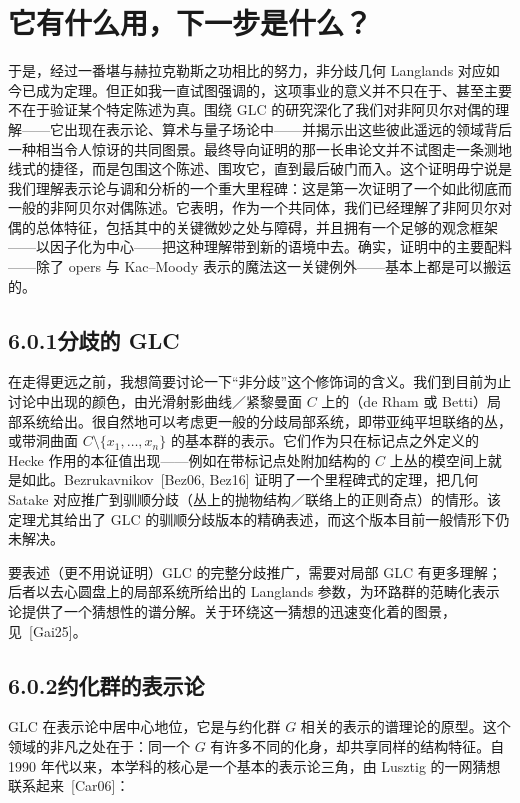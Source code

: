 \section{它有什么用，下一步是什么？}\label{sec:6}

于是，经过一番堪与赫拉克勒斯之功相比的努力，非分歧几何 Langlands 对应如今已成为定理。但正如我一直试图强调的，这项事业的意义并不只在于、甚至主要不在于验证某个特定陈述为真。围绕 GLC 的研究深化了我们对非阿贝尔对偶的理解——它出现在表示论、算术与量子场论中——并揭示出这些彼此遥远的领域背后一种相当令人惊讶的共同图景。最终导向证明的那一长串论文并不试图走一条测地线式的捷径，而是包围这个陈述、围攻它，直到最后破门而入。这个证明毋宁说是我们理解表示论与调和分析的一个重大里程碑：这是第一次证明了一个如此彻底而一般的非阿贝尔对偶陈述。它表明，作为一个共同体，我们已经理解了非阿贝尔对偶的总体特征，包括其中的关键微妙之处与障碍，并且拥有一个足够的观念框架——以因子化为中心——把这种理解带到新的语境中去。确实，证明中的主要配料——除了 opers 与 Kac–Moody 表示的魔法这一关键例外——基本上都是可以搬运的。

\subsection*{6.0.1\quad 分歧的 GLC}

在走得更远之前，我想简要讨论一下“非分歧”这个修饰词的含义。我们到目前为止讨论中出现的颜色，由光滑射影曲线／紧黎曼面 $C$ 上的（de Rham 或 Betti）局部系统给出。很自然地可以考虑更一般的分歧局部系统，即带亚纯平坦联络的丛，或带洞曲面 $C\setminus\{x_{1},\dots,x_{n}\}$ 的基本群的表示。它们作为只在标记点之外定义的 Hecke 作用的本征值出现——例如在带标记点处附加结构的 $C$ 上丛的模空间上就是如此。Bezrukavnikov~[Bez06, Bez16] 证明了一个里程碑式的定理，把几何 Satake 对应推广到驯顺分歧（丛上的抛物结构／联络上的正则奇点）的情形。该定理尤其给出了 GLC 的驯顺分歧版本的精确表述，而这个版本目前一般情形下仍未解决。

要表述（更不用说证明）GLC 的完整分歧推广，需要对局部 GLC 有更多理解；后者以去心圆盘上的局部系统所给出的 Langlands 参数，为环路群的范畴化表示论提供了一个猜想性的谱分解。关于环绕这一猜想的迅速变化着的图景，见~[Gai25]。

\subsection*{6.0.2\quad 约化群的表示论}

GLC 在表示论中居中心地位，它是与约化群 $G$ 相关的表示的谱理论的原型。这个领域的非凡之处在于：同一个 $G$ 有许多不同的化身，却共享同样的结构特征。自 1990 年代以来，本学科的核心是一个基本的表示论三角，由 Lusztig 的一网猜想联系起来~[Car06]：

